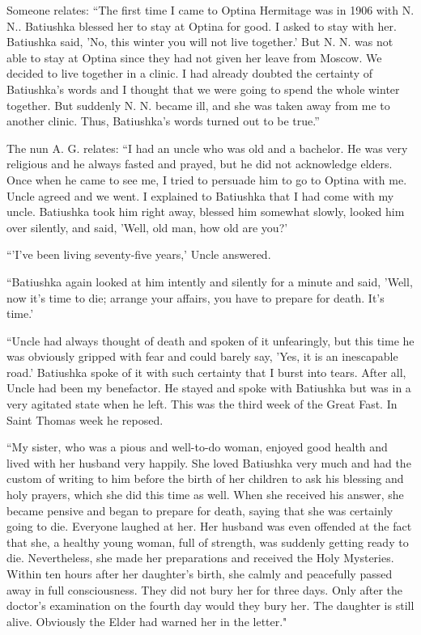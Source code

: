 Someone relates: “The first time I came to Optina Hermitage was in 1906 with N. N.. Batiushka blessed her to stay at Optina for good. I asked to stay with her. Batiushka said, 'No, this winter you will not live together.' But N. N. was not able to stay at Optina since they had not given her leave from Moscow. We decided to live together in a clinic. I had already doubted the certainty of Batiushka's words and I thought that we were going to spend the whole winter together. But suddenly N. N. became ill, and she was taken away from me to another clinic. Thus, Batiushka's words turned out to be true.”

The nun A. G. relates: “I had an uncle who was old and a bachelor. He was very religious and he always fasted and prayed, but he did not acknowledge elders. Once when he came to see me, I tried to persuade him to go to Optina with me. Uncle agreed and we went. I explained to Batiushka that I had come with my uncle. Batiushka took him right away, blessed him somewhat slowly, looked him over silently, and said, 'Well, old man, how old are you?'

“'I've been living seventy-five years,' Uncle answered.

“Batiushka again looked at him intently and silently for a minute and said, 'Well, now it's time to die; arrange your affairs, you have to prepare for death. It's time.'

“Uncle had always thought of death and spoken of it unfearingly, but this time he was obviously gripped with fear and could barely say, 'Yes, it is an inescapable road.' Batiushka spoke of it with such certainty that I burst into tears. After all, Uncle had been my benefactor. He stayed and spoke with Batiushka but was in a very agitated state when he left. This was the third week of the Great Fast. In Saint Thomas week he reposed.

“My sister, who was a pious and well-to-do woman, enjoyed good health and lived with her husband very happily. She loved Batiushka very much and had the custom of writing to him before the birth of her children to ask his blessing and holy prayers, which she did this time as well. When she received his answer, she became pensive and began to prepare for death, saying that she was certainly going to die. Everyone laughed at her. Her husband was even offended at the fact that she, a healthy young woman, full of strength, was suddenly getting ready to die. Nevertheless, she made her preparations and received the Holy Mysteries. Within ten hours after her daughter's birth, she calmly and peacefully passed away in full consciousness. They did not bury her for three days. Only after the doctor's examination on the fourth day would they bury her. The daughter is still alive. Obviously the Elder had warned her in the letter."


